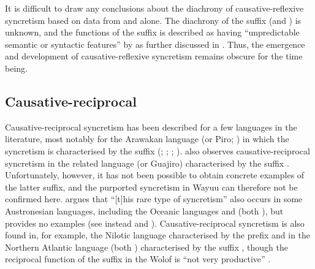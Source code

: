 It is difficult to draw any conclusions about the diachrony of causative-reflexive syncretism based on data from  and  alone. The diachrony of the  suffix  (and ) is  unknown, and the functions of the  suffix  is described as having “unpredictable semantic or syntactic features” by \cite[243]{dunn:1999} as further discussed in . Thus, the emergence and development of causative-reflexive syncretism remains obscure for the time being.

\subsection{Causative-reciprocal} \label{sec:simple-syncretism:caus-recp}
Causative-reciprocal syncretism has been described for a few languages in the literature, most notably for the Arawakan language  (or Piro; ) in which the syncretism is characterised by the suffix  (\citealt[38]{nedjalkov:silnickij:1969}; \citealt{kulikov:nedjalkov:1992}; \citealt[894]{kulikov:2001}; \citealt[292]{nedjalkov:2007d}). \cite[286]{nedjalkov:2007d} also observes causative-reciprocal syncretism in the related language  (or Guajiro) characterised by the suffix . Unfortunately, however, it has not been possible to obtain concrete examples of the latter suffix, and the purported syncretism in Wayuu can therefore not be confirmed here. \cite[894]{kulikov:2001} argues that “[t]his rare type of syncretism” also occurs in some Austronesian languages, including the Oceanic languages  and  (both ), but provides no examples (see instead \citealt[181f.]{johnston:1978} and \citealt[286]{nedjalkov:2007d}). Causative-reciprocal syncretism is also found in, for example, the Nilotic language  characterised by the prefix  \citep[285ff.]{nedjalkov:2007d} and in the Northern Atlantic language  (both ) characterised by the suffix , though the reciprocal function of the suffix  in the Wolof is “not very productive” \citep[298]{creissels:nouguier-voisin:2008}.

